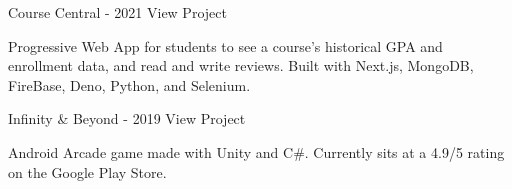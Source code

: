 

\begin{cventries}

  \cventry
    {} %
    {Course Central - 2021} %
    {View Project} %
    {} %
    {
      \begin{cvitems} %
        \item {Progressive Web App for students to see a course's historical GPA and enrollment data, and read and write reviews. Built with Next.js, MongoDB, FireBase, Deno, Python, and Selenium.}
      \end{cvitems}
    }

  \cventry
    {} %
    {Infinity \& Beyond - 2019} %
    {View Project} %
    {} %
    {
      \begin{cvitems} %
        \item {Android Arcade game made with Unity and C\#. Currently sits at a 4.9/5 rating on the Google Play Store.}
      \end{cvitems}
    }


\end{cventries}
